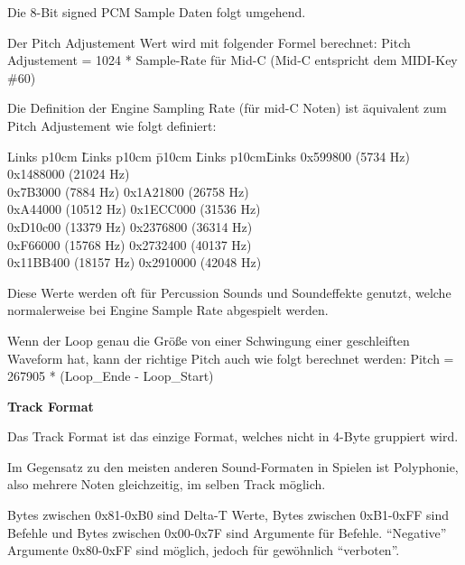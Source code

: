 \documentclass[11pt,a4paper]{scrartcl}
\newcommand{\paratitle}[1] {
    \vspace{5mm}
    \large \textbf{#1} \normalsize
    \vspace{2mm}\newline
}
\begin{document}
Die 8-Bit signed PCM Sample Daten folgt umgehend.

Der Pitch Adjustement Wert wird mit folgender Formel berechnet:\newline
Pitch Adjustement = 1024 * Sample-Rate f\"ur Mid-C (Mid-C entspricht dem MIDI-Key \#60)

Die Definition der Engine Sampling Rate (f\"ur mid-C Noten) ist \"aquivalent zum Pitch Adjustement wie folgt definiert:

\begin{tabbing}
    Links p{10cm} \= Links p{10cm} \=p{10cm} \= Links p{10cm}\= Links \kill
		0x599800  \>(5734 Hz) \>\>0x1488000 \>(21024 Hz)\\
		0x7B3000  \>(7884 Hz)  \>\>0x1A21800 \>(26758 Hz)\\
		0xA44000  \>(10512 Hz)  \>\>0x1ECC000 \>(31536 Hz)\\
		0xD10c00  \>(13379 Hz)  \>\>0x2376800 \>(36314 Hz)\\
		0xF66000  \>(15768 Hz)  \>\>0x2732400 \>(40137 Hz)\\
		0x11BB400 \>(18157 Hz)  \>\>0x2910000 \>(42048 Hz)\\
\end{tabbing}

Diese Werte werden oft f\"ur Percussion Sounds und Soundeffekte genutzt, welche normalerweise bei Engine Sample Rate abgespielt werden.

Wenn der Loop genau die Gr\"o{\ss}e von einer Schwingung einer geschleiften Waveform hat, kann der richtige Pitch auch wie folgt berechnet werden:\newline
Pitch = 267905 * (Loop\_Ende - Loop\_Start)

\paratitle{Track Format}
Das Track Format ist das einzige Format, welches nicht in 4-Byte gruppiert wird.

Im Gegensatz zu den meisten anderen Sound-Formaten in Spielen ist Polyphonie, also mehrere Noten gleichzeitig, im selben Track m\"oglich.

Bytes zwischen 0x81-0xB0 sind Delta-T Werte, Bytes zwischen 0xB1-0xFF sind Befehle und Bytes zwischen 0x00-0x7F sind Argumente f\"ur Befehle. \enquote{Negative} Argumente 0x80-0xFF sind m\"oglich, jedoch f\"ur gew\"ohnlich \enquote{verboten}.
\end{document}
